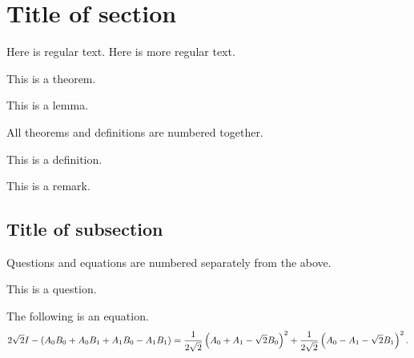 \section{Title of section} \label{sec:titleofsection}

Here is regular text.  Here is more regular text. 

\begin{thm} \label{thm:nameoftheorem}
This is a theorem.
\end{thm}

\begin{lem}
This is a lemma.
\end{lem}

All theorems and definitions are numbered together.

\begin{defn}
This is a definition.
\end{defn}

\begin{rmk}
This is a remark.
\end{rmk}

\subsection{Title of subsection}

Questions and equations are numbered separately from the above.

\begin{question}
This is a question.
\end{question}

The following is an equation.
\begin{equation}\label{eqn:nameofequation}
2\sqrt{2}I - \left(A_0 B_0 + A_0 B_1 + A_1 B_0 - A_1 B_1\right) = \frac{1}{2\sqrt{2}}\left(A_0 + A_1 - \sqrt{2} B_0\right)^2 +  \frac{1}{2\sqrt{2}}\left(A_0 - A_1 - \sqrt{2} B_1\right)^2.
\end{equation}